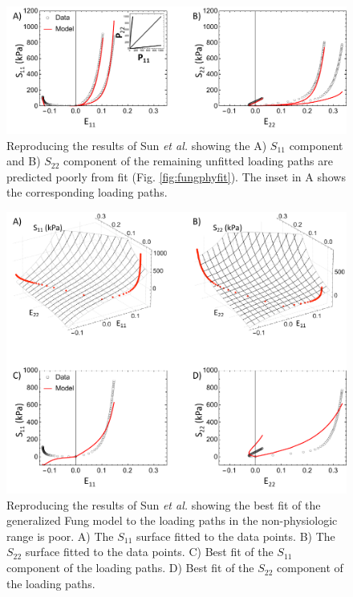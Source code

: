 \begin{figure}[hptb]
\centering
\includegraphics[width=\textwidth]{Images/chapter5/fungphypred}
\caption{Reproducing the results of Sun \textit{et al.} \cite{sun_biaxial_2003} showing the A) $S_{11}$ component and B) $S_{22}$ component of the remaining unfitted loading paths are predicted poorly from fit (Fig. \ref{fig:fungphyfit}). The inset in A shows the corresponding loading paths.}
\label{fig:fungphypred}
\end{figure} 


\begin{figure}[hptb]
\centering
\includegraphics[width=\textwidth]{Images/chapter5/fungoutfit}
\caption{Reproducing the results of Sun \textit{et al.} \cite{sun_biaxial_2003} showing the best fit of the generalized Fung model to the loading paths in the non-physiologic range is poor. A) The $S_{11}$ surface fitted to the data points. B) The $S_{22}$ surface fitted to the data points. C) Best fit of the $S_{11}$ component of the loading paths. D) Best fit of the $S_{22}$ component of the loading paths.}
\label{fig:fungoutfit}
\end{figure} 

